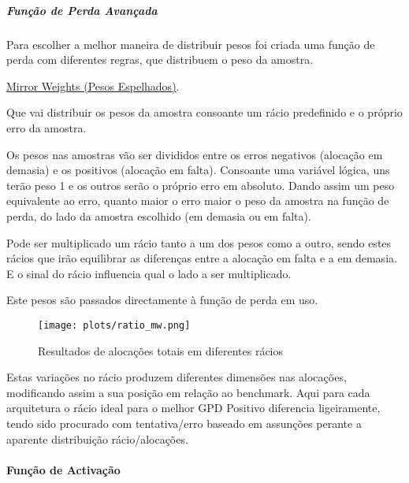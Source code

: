 

\subparagraph{Função de Perda Avançada}\label{se:advancedloss}
\text{ }  \par
Para escolher a melhor maneira de distribuir pesos foi criada uma função de perda com diferentes regras, que distribuem o peso da amostra.\par
\href{https://github.com/alquimodelia/alquitable/blob/main/alquitable/advanced_losses.py#L33}{Mirror Weights (Pesos Espelhados)}.\par
Que vai distribuir os pesos da amostra consoante um rácio predefinido e o próprio erro da amostra.\par
Os pesos nas amostras vão ser divididos entre os erros negativos (alocação em demasia) e os positivos (alocação em falta). Consoante uma variável lógica,  uns terão peso 1 e os outros serão o próprio erro em absoluto. Dando assim um peso equivalente ao erro, quanto maior o erro maior o peso da amostra na função de perda, do lado da amostra escolhido (em demasia ou em falta).\par
Pode ser multiplicado um rácio tanto a um dos pesos como a outro, sendo estes rácios que irão equilibrar as diferenças entre a alocação em falta e a em demasia. E o sinal do rácio influencia qual o lado a ser multiplicado.\par
Este pesos são passados directamente à função de perda em uso.\par


\begin{figure}[H]
    \centering
    \texttt{[image: plots/ratio\_mw.png]}
    \caption{Resultados de alocações totais em diferentes rácios}
    \label{fig:resexpratiomw}
  \end{figure}

Estas variações no rácio produzem diferentes dimensões nas alocações, modificando assim a sua posição em relação ao benchmark. Aqui para cada arquitetura o rácio ideal para o melhor GPD Positivo diferencia ligeiramente, tendo sido procurado com tentativa/erro baseado em assunções perante a aparente distribuição rácio/alocações.\par


\paragraph{Função de Activação}
\text{ }  \par

